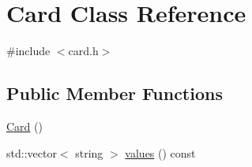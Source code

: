 \hypertarget{class_card}{}\section{Card Class Reference}
\label{class_card}


{\ttfamily \#include $<$card.\+h$>$}

\subsection*{Public Member Functions}
\begin{DoxyCompactItemize}
\item 
\mbox{\hyperlink{class_card_a783f5854cbe8c183ee3d4414c01472c0}{Card}} ()
\item 
std\+::vector$<$ string $>$ \mbox{\hyperlink{class_card_ac87b724afb93764edd8900170ced32bc}{values}} () const
\end{DoxyCompactItemize}
